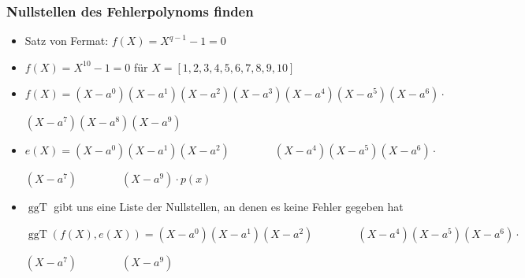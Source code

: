 \documentclass[11pt,aspectratio=169]{beamer}
\begin{document}
	\begin{frame}
		\frametitle{Nullstellen des Fehlerpolynoms finden}
		
		\begin{itemize}
			\item Satz von Fermat: $f(X) = X^{q-1}-1=0$
			
			\vspace{10pt}
			
			\item $f(X) = X^{10}-1 = 0$ \qquad für $X = [1,2,3,4,5,6,7,8,9,10]$
			
			\vspace{10pt}
			
			\item $f(X) = (X-a^0)(X-a^1)(X-a^2)(X-a^3)(X-a^4)(X-a^5)(X-a^6) \cdot$
			
			\qquad \qquad $(X-a^7)(X-a^8)(X-a^9)$
			
			\vspace{10pt}
			
			\item $e(X) = (X-a^0)(X-a^1)(X-a^2) \qquad \qquad (X-a^4)(X-a^5)(X-a^6) \cdot$
			
			\qquad \qquad $(X-a^7) \qquad \qquad (X-a^9) \cdot p(x)$
			
			\vspace{10pt}
			
			\item $\operatorname{ggT}$ gibt uns eine Liste der Nullstellen, an denen es keine Fehler gegeben hat
			
			\vspace{10pt}
			
			$\operatorname{ggT}(f(X),e(X)) = (X-a^0)(X-a^1)(X-a^2) \qquad \qquad (X-a^4)(X-a^5)(X-a^6) \cdot$
			
			\qquad \qquad \qquad \qquad $(X-a^7) \qquad \qquad (X-a^9)$
				
		\end{itemize}
			
	\end{frame}
\end{document}
